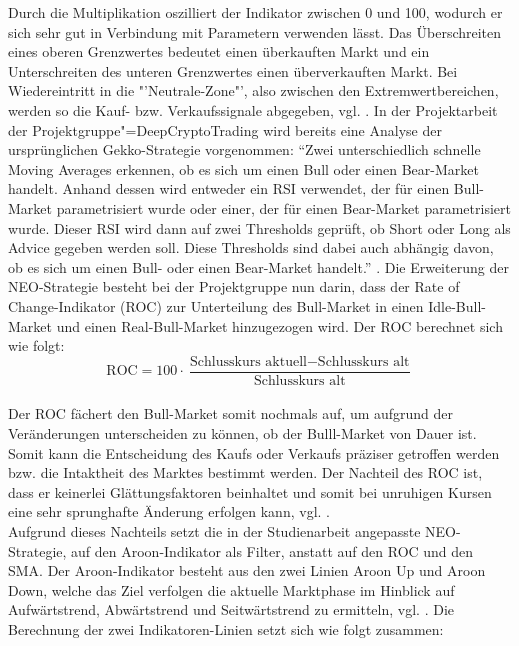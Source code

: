 Durch die Multiplikation oszilliert der Indikator zwischen 0 und 100, wodurch er sich sehr gut in Verbindung mit Parametern verwenden lässt. Das Überschreiten eines oberen Grenzwertes bedeutet einen überkauften Markt und ein Unterschreiten des unteren Grenzwertes einen überverkauften Markt. Bei Wiedereintritt in die "'Neutrale-Zone"', also zwischen den Extremwertbereichen, werden so die Kauf- bzw. Verkaufssignale abgegeben, vgl. \cite{ber20}. In der Projektarbeit der Projektgruppe"=DeepCryptoTrading wird bereits eine Analyse der ursprünglichen Gekko-Strategie vorgenommen: "`Zwei unterschiedlich schnelle Moving Averages erkennen, ob es sich um einen Bull oder einen Bear-Market handelt. Anhand dessen wird entweder ein RSI verwendet, der für einen Bull-Market parametrisiert wurde oder einer, der für einen Bear-Market parametrisiert wurde. Dieser RSI wird dann auf zwei Thresholds geprüft, ob Short oder Long als Advice gegeben werden soll. Diese Thresholds sind dabei auch abhängig davon, ob es sich um einen Bull- oder einen Bear-Market handelt."' \cite{pro19}. Die Erweiterung der NEO-Strategie besteht bei der Projektgruppe nun darin, dass der Rate of Change-Indikator (ROC) zur Unterteilung des Bull-Market in einen Idle-Bull-Market und einen Real-Bull-Market hinzugezogen wird. Der ROC berechnet sich wie folgt: \\ 

\begin{equation}
\text{ROC}=100\cdot\frac{\text{Schlusskurs aktuell}- \text{Schlusskurs alt}}{\text{Schlusskurs alt}}
\end{equation} \\

Der ROC fächert den Bull-Market somit nochmals auf, um aufgrund der Veränderungen unterscheiden zu können, ob der Bulll-Market von Dauer ist. Somit kann die Entscheidung des Kaufs oder Verkaufs präziser getroffen werden bzw. die Intaktheit des Marktes bestimmt werden. Der Nachteil des ROC ist, dass er keinerlei Glättungsfaktoren beinhaltet und somit bei unruhigen Kursen eine sehr sprunghafte Änderung erfolgen kann, vgl. \cite{tra20}.\\

Aufgrund dieses Nachteils setzt die in der Studienarbeit angepasste NEO-Strategie, auf den Aroon-Indikator als Filter, anstatt auf den ROC und den SMA. Der Aroon-Indikator besteht aus den zwei Linien Aroon Up und Aroon Down, welche das Ziel verfolgen die aktuelle Marktphase im Hinblick auf Aufwärtstrend, Abwärtstrend und Seitwärtstrend zu ermitteln, vgl. \cite{ber201}. Die Berechnung der zwei Indikatoren-Linien setzt sich wie folgt zusammen: \\

